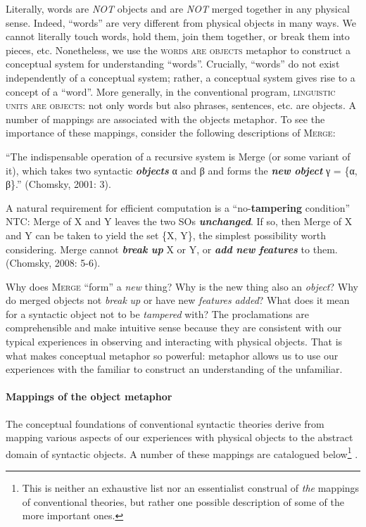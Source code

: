   Literally, words are \textit{NOT} objects and are \textit{NOT} merged together in any physical sense. Indeed, “words” are very different from physical objects in many ways. We cannot literally touch words, hold them, join them together, or break them into pieces, etc. Nonetheless, we use the \textsc{words} \textsc{are} \textsc{objects} metaphor to construct a conceptual system for understanding “words”. Crucially, “words” do not exist independently of a conceptual system; rather, a conceptual system gives rise to a concept of a “word”. More generally, in the conventional program, \textsc{linguistic} \textsc{units} \textsc{are} \textsc{objects}: not only words but also phrases, sentences, etc. are objects. A number of mappings are associated with the objects metaphor. To see the importance of these mappings, consider the following descriptions of \textsc{Merge}: 

“The indispensable operation of a recursive system is Merge (or some variant of it), which takes two syntactic \textbf{\textit{objects}} α and β and forms the \textbf{\textit{new} \textit{object}} γ = \{α, β\}.” (Chomsky, 2001: 3).

A natural requirement for efficient computation is a “no-\textbf{tampering} condition” NTC: Merge of X and Y leaves the two SOs \textbf{\textit{unchanged}}. If so, then Merge of X and Y can be taken to yield the set \{X, Y\}, the simplest possibility worth considering. Merge cannot \textbf{\textit{break} \textit{up}} X or Y, or \textbf{\textit{add} \textit{new} \textit{features}} to them. (Chomsky, 2008: 5-6).

  Why does \textsc{Merge} “form” a \textit{new} thing? Why is the new thing also an \textit{object}? Why do merged objects not \textit{break} \textit{up} or have new \textit{features} \textit{added}? What does it mean for a syntactic object not to be \textit{tampered} with? The proclamations are comprehensible and make intuitive sense because they are consistent with our typical experiences in observing and interacting with physical objects. That is what makes conceptual metaphor so powerful: metaphor allows us to use our experiences with the familiar to construct an understanding of the unfamiliar. 

\paragraph{Mappings of the object metaphor}

The conceptual foundations of conventional syntactic theories derive from mapping various aspects of our experiences with physical objects to the abstract domain of syntactic objects. A number of these mappings are catalogued below\footnote{This is neither an exhaustive list nor an essentialist construal of \textit{the} mappings of conventional theories, but rather one possible description of some of the more important ones.} .

